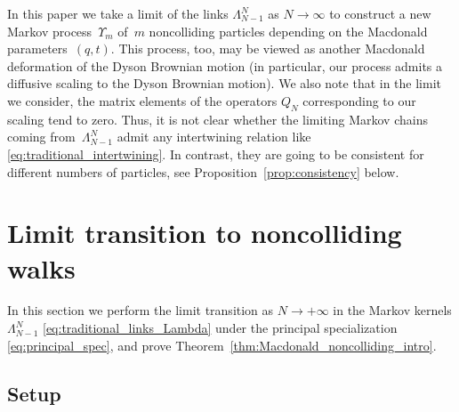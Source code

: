 \documentclass[pdftex]{sigma}
\numberwithin{equation}{section}
\begin{document}
In this paper we take a limit of the links
$\Lambda^{N}_{N-1}$ as $N\to\infty$ to construct
a new Markov process~$\Upsilon_m$ of~$m$ noncolliding particles
depending on the Macdonald parameters~$(q,t)$.
This process, too,
may be viewed as another Macdonald deformation
of the Dyson Brownian motion (in particular,
our process admits a diffusive scaling
to the Dyson Brownian motion).
We also note that in the limit we consider, the matrix elements of the
operators $Q_N$ corresponding to our scaling tend to zero. Thus, it is not clear
whether the limiting Markov chains coming from~$\Lambda^{N}_{N-1}$ admit any intertwining relation like \eqref{eq:traditional_intertwining}.
In contrast, they are going to be consistent for
different numbers of particles, see
Proposition~\ref{prop:consistency} below.

\section{Limit transition to noncolliding walks}\label{sec:limit_transition}

In this section we perform the limit transition as $N\to+\infty$ in the
Markov kernels $\Lambda^{N}_{N-1}$ \eqref{eq:traditional_links_Lambda}
under the principal specialization
\eqref{eq:principal_spec}, and prove
Theorem~\ref{thm:Macdonald_noncolliding_intro}.

\subsection{Setup}\label{sub:limit_transition_setup}
\end{document}
